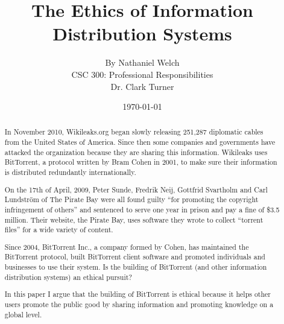 \documentclass[11pt]{article}
\begin{document}
\title{\vfill The Ethics of Information Distribution Systems} %
\author{
By Nathaniel Welch\vspace{10pt}\\
CSC 300: Professional Responsibilities\vspace{10pt}\\
Dr. Clark Turner\vspace{10pt}\\
}
\date{\today}

\maketitle

\vfill
\doublespacing
\begin{abstract}
In November 2010, Wikileaks.org began slowly releasing 251,287 diplomatic cables from the United States of America. \cite{cablegate} Since then some companies and governments have attacked the organization because they are sharing this information. Wikileaks uses BitTorrent, a protocol written by Bram Cohen in 2001, to make sure their information is distributed redundantly internationally.

On the 17th of April, 2009, Peter Sunde, Fredrik Neij, Gottfrid Svartholm and Carl Lundström of The Pirate Bay were all found guilty ``for promoting the copyright infringement of others'' and sentenced to serve one year in prison and pay a fine of \$3.5 million. \cite{tpbverdict} Their website, the Pirate Bay, uses software they wrote to collect ``torrent files'' for a wide variety of content.

Since 2004, BitTorrent Inc., a company formed by Cohen, has maintained the BitTorrent protocol, built BitTorrent client software and promoted individuals and businesses to use their system. Is the building of BitTorrent (and other information distribution systems) an ethical pursuit?

In this paper I argue that the building of BitTorrent is ethical because it helps other users promote the public good by sharing information and promoting knowledge on a global level.
\end{abstract}

\thispagestyle{empty}
\newpage
\thispagestyle{empty}
\tableofcontents
\newpage

\end{document}
